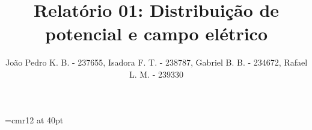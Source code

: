 \documentclass[reprint, amsmath,amssymb,onecolumn,notitlepage, 11pt, a4paper]{article}
\begin{document}
\font\myfont=cmr12 at 40pt


\title{Relatório 01: Distribuição de potencial e campo elétrico} %
\author{João Pedro K. B. - 237655, Isadora F. T. - 238787, Gabriel B. B. - 234672, Rafael L. M. - 239330} %

\date{} %
\maketitle %


\clearpage


\clearpage


\end{document}
